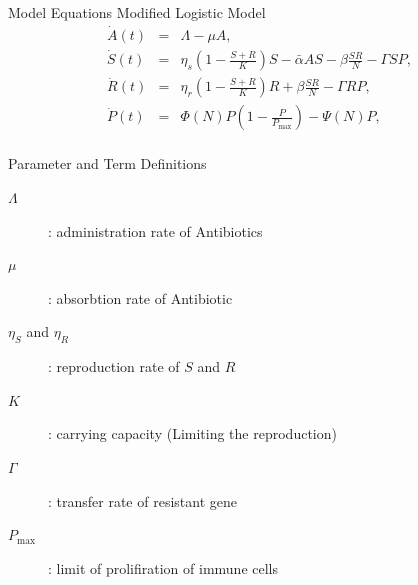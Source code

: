\documentclass{beamer}
\begin{document}
\begin{frame}{Model Equations}
  Modified Logistic Model
  \begin{eqnarray*} \label{sys}
    \dot{A}(t) & = & \Lambda - \mu A, \\
    \dot{S}(t) & = & \eta_s\left(1 - \frac{S+R}{K}\right)S - \bar{\alpha}AS - \beta\frac{SR}{N} - \Gamma SP, \\
    \dot{R}(t) & = & \eta_r\left(1 - \frac{S+R}{K}\right)R + \beta\frac{SR}{N} - \Gamma RP, \\
    \dot{P}(t) & = & \Phi(N)P\left(1 - \frac{P}{P_{\max}}\right) - \Psi(N)P, \\
  \end{eqnarray*}
\end{frame}

\begin{frame}{Parameter and Term Definitions}
  \begin{description}
    \item[$\Lambda$]: administration rate of Antibiotics
    \item[$\mu$]: absorbtion rate of Antibiotic 
    \item[$\eta_S$ and $\eta_R$]: reproduction rate of $S$ and $R$
    \item[$K$]: carrying capacity (Limiting the reproduction) 
    \item[$\Gamma$]: transfer rate of resistant gene
    \item[$P_{\text{max}}$]: limit of prolifiration of immune cells
  \end{description}
\end{frame}
\end{document}
